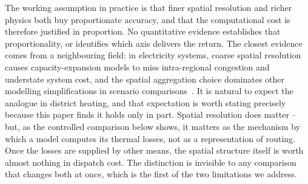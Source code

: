 The working assumption in practice is that finer spatial resolution and richer physics
both buy proportionate accuracy, and that the computational cost is therefore justified in
proportion. No quantitative evidence establishes that proportionality, or identifies which
axis delivers the return. The closest evidence comes from a neighbouring field: in
electricity systems, coarse spatial resolution causes capacity-expansion models to miss
intra-regional congestion and understate system cost, and the spatial aggregation choice
dominates other modelling simplifications in scenario
comparisons~\cite{Frysztacki2021}. It is natural to expect the analogue in district
heating, and that expectation is worth stating precisely because this paper finds it
holds only in part. Spatial resolution does matter -- but, as the controlled comparison
below shows, it matters as the mechanism by which a model computes its thermal losses,
not as a representation of routing. Once the losses are supplied by other means, the
spatial structure itself is worth almost nothing in dispatch cost. The distinction is
invisible to any comparison that changes both at once, which is the first of the two
limitations we address.
